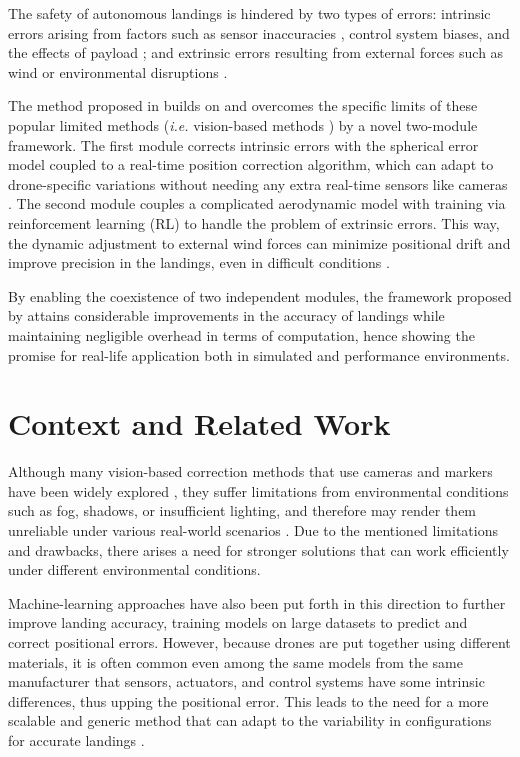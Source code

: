 \documentclass[10pt,journal,compsoc]{IEEEtran}
\begin{document}
The safety of autonomous landings is hindered by two types of errors: intrinsic errors arising from factors such as sensor inaccuracies \cite{jono}, control system biases, and the effects of payload \cite{Qian2020}; and extrinsic errors resulting from external forces such as wind or environmental disruptions \cite{Liu2022}.

The method proposed in \cite{studied} builds on and overcomes the specific limits of these popular limited methods (\textit{i.e.} vision-based methods \cite{Sudevan2017}) by a novel two-module framework. The first module corrects intrinsic errors with the spherical error model coupled to a real-time position correction algorithm, which can adapt to drone-specific variations without needing any extra real-time sensors like cameras \cite{studied}. The second module couples a complicated aerodynamic model with training via reinforcement learning (RL) \cite{Kober2013} to handle the problem of extrinsic errors. This way, the dynamic adjustment to external wind forces can minimize positional drift and improve precision in the landings, even in difficult conditions \cite{Liu2022}.

By enabling the coexistence of two independent modules, the framework proposed by \cite{studied} attains considerable improvements in the accuracy of landings while maintaining negligible overhead in terms of computation, hence showing the promise for real-life application both in simulated and performance environments.

\section{Context and Related Work}\label{sec:context}

Although many vision-based correction methods that use cameras and markers have been widely explored \cite{Sudevan2017}, they suffer limitations from environmental conditions such as fog, shadows, or insufficient lighting, and therefore may render them unreliable under various real-world scenarios \cite{Cocchioni2016}. Due to the mentioned limitations and drawbacks, there arises a need for stronger solutions that can work efficiently under different environmental conditions.

Machine-learning approaches have also been put forth in this direction to further improve landing accuracy, training models on large datasets to predict and correct positional errors. However, because drones are put together using different materials, it is often common even among the same models from the same manufacturer that sensors, actuators, and control systems have some intrinsic differences, thus upping the positional error. This leads to the need for a more scalable and generic method that can adapt to the variability in configurations for accurate landings \cite{Petritoli2018, 37}.
\end{document}
